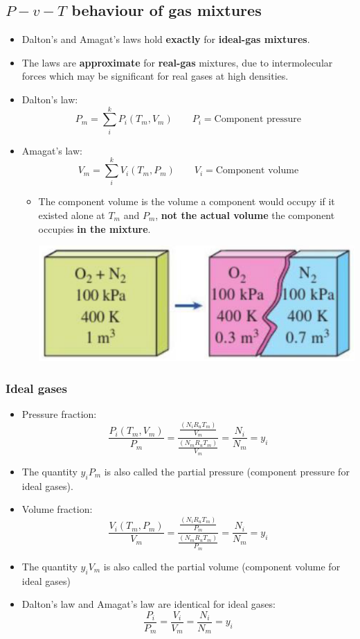 \documentclass[11pt]{article}
\begin{document}
\subsection{\(P-v-T\) behaviour of gas mixtures}
\label{sec:org7265e39}
\begin{itemize}
\item Dalton's and Amagat's laws hold \textbf{exactly} for \textbf{ideal-gas mixtures}.
\item The laws are \textbf{approximate} for \textbf{real-gas} mixtures, due to intermolecular forces which may be significant for real gases at high densities.
\item Dalton's law:
\[P_m = \sum_i^k P_i (T_m, V_m) \qquad P_i = \text{Component pressure}\]
\item Amagat's law:
\[V_m = \sum_i^k V_i (T_m, P_m) \qquad V_i = \text{Component volume}\]
\begin{itemize}
\item The component volume is the volume a component would occupy if it existed alone at \(T_m\) and \(P_m\), \textbf{not the actual volume} the component occupies \textbf{in the mixture}.
\begin{center}
\includegraphics[width=.9\linewidth]{./images/component-volume-diagram.png}
\end{center}
\end{itemize}
\end{itemize}

 \newpage

\subsubsection{Ideal gases}
\label{sec:orgcffea23}
\begin{itemize}
\item Pressure fraction:
\[\frac{P_i(T_m, V_m)}{P_m} = \frac{\frac{(N_i R_u T_m)}{V_m}}{\frac{(N_m R_u T_m)}{V_m}} = \frac{N_i}{N_m} = y_i\]
\item The quantity \(y_i P_m\) is also called the partial pressure (component pressure for ideal gases).
\item Volume fraction:
\[\frac{V_i(T_m, P_m)}{V_m} = \frac{\frac{(N_i R_u T_m)}{P_m}}{\frac{(N_m R_u T_m)}{P_m}} = \frac{N_i}{N_m} = y_i\]
\item The quantity \(y_i V_m\) is also called the partial volume (component volume for ideal gases)
\item Dalton's law and Amagat's law are identical for ideal gases:
\[\frac{P_i}{P_m} = \frac{V_i}{V_m} = \frac{N_i}{N_m} = y_i\]
\end{itemize}
\end{document}
